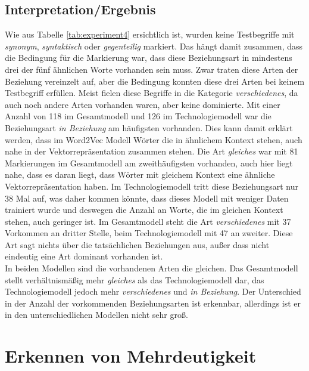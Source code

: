 \documentclass[12pt,a4paper]{report}
\begin{document}
		\subsection*{Interpretation/Ergebnis}
		Wie aus Tabelle \ref{tab:experiment4} ersichtlich ist, wurden keine Testbegriffe mit \textit{synonym}, \textit{syntaktisch} oder \textit{gegenteilig} markiert. Das hängt damit zusammen, dass die Bedingung für die Markierung war, dass diese Beziehungsart in mindestens drei der fünf ähnlichen Worte vorhanden sein muss. Zwar traten diese Arten der Beziehung vereinzelt auf, aber die Bedingung konnten diese drei Arten bei keinem Testbegriff erfüllen. Meist fielen diese Begriffe in die Kategorie \textit{verschiedenes}, da auch noch andere Arten vorhanden waren, aber keine dominierte. Mit einer Anzahl von 118 im Gesamtmodell und 126 im Technologiemodell war die Beziehungsart \textit{in Beziehung} am häufigsten vorhanden. Dies kann damit erklärt werden, dass im Word2Vec Modell Wörter die in ähnlichem Kontext stehen, auch nahe in der Vektorrepräsentation zusammen stehen. Die Art \textit{gleiches} war mit 81 Markierungen im Gesamtmodell am zweithäufigsten vorhanden, auch hier liegt nahe, dass es daran liegt, dass Wörter mit gleichem Kontext eine ähnliche Vektorrepräsentation haben. Im Technologiemodell tritt diese Beziehungsart nur 38 Mal auf, was daher kommen könnte, dass dieses Modell mit weniger Daten trainiert wurde und deswegen die Anzahl an Worte, die im gleichen Kontext stehen, auch geringer ist. Im Gesamtmodell steht die Art \textit{verschiedenes} mit 37 Vorkommen an dritter Stelle, beim Technologiemodell mit 47 an zweiter. Diese Art sagt nichts über die tatsächlichen Beziehungen aus, außer dass nicht eindeutig eine Art dominant vorhanden ist. \\
		In beiden Modellen sind die vorhandenen Arten die gleichen. Das Gesamtmodell stellt verhältnismäßig mehr \textit{gleiches} als das Technologiemodell dar, das Technologiemodell jedoch mehr \textit{verschiedenes} und \textit{in Beziehung}. Der Unterschied in der Anzahl der vorkommenden Beziehungsarten ist erkennbar, allerdings ist er in den unterschiedlichen Modellen nicht sehr groß.
		
		
		
		
		
		
	
	\section{Erkennen von Mehrdeutigkeit}
	
\end{document}
